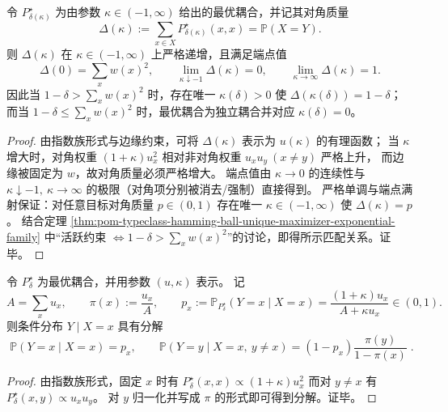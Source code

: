 \begin{theorem}[对角质量的严格单调性与唯一匹配]\label{thm:pom-typeclass-diagonal-mass-monotone}
令 \(P^\star_{\delta(\kappa)}\) 为由参数 \(\kappa\in(-1,\infty)\) 给出的最优耦合，并记其对角质量
\[
\Delta(\kappa):=\sum_{x\in X}P^\star_{\delta(\kappa)}(x,x)=\mathbb P(X=Y).
\]
则 \(\Delta(\kappa)\) 在 \(\kappa\in(-1,\infty)\) 上严格递增，且满足端点值
\[
\Delta(0)=\sum_x w(x)^2,\qquad
\lim_{\kappa\downarrow-1}\Delta(\kappa)=0,\qquad
\lim_{\kappa\to\infty}\Delta(\kappa)=1.
\]
因此当 \(1-\delta>\sum_x w(x)^2\) 时，存在唯一 \(\kappa(\delta)>0\) 使 \(\Delta(\kappa(\delta))=1-\delta\)；
而当 \(1-\delta\le \sum_x w(x)^2\) 时，最优耦合为独立耦合并对应 \(\kappa(\delta)=0\)。
\end{theorem}
\begin{proof}
由指数族形式与边缘约束，可将 \(\Delta(\kappa)\) 表示为 \(u(\kappa)\) 的有理函数；
当 \(\kappa\) 增大时，对角权重 \((1+\kappa)u_x^2\) 相对非对角权重 \(u_xu_y\ (x\neq y)\) 严格上升，
而边缘被固定为 \(w\)，故对角质量必须严格增大。
端点值由 \(\kappa\to 0\) 的连续性与 \(\kappa\downarrow-1,\ \kappa\to\infty\) 的极限（对角项分别被消去/强制）直接得到。
严格单调与端点满射保证：对任意目标对角质量 \(p\in(0,1)\) 存在唯一 \(\kappa\in(-1,\infty)\) 使 \(\Delta(\kappa)=p\)。
结合定理 \ref{thm:pom-typeclass-hamming-ball-unique-maximizer-exponential-family} 中“活跃约束 \(\Leftrightarrow 1-\delta>\sum_x w(x)^2\)”的讨论，即得所示匹配关系。证毕。
\end{proof}

\begin{theorem}\label{thm:pom-typeclass-keep-resample-channel}
令 \(P^\star_\delta\) 为最优耦合，并用参数 \((u,\kappa)\) 表示。
记
\[
A=\sum_x u_x,\qquad \pi(x):=\frac{u_x}{A},
\qquad
p_x:=\mathbb P_{P^\star_\delta}(Y=x\mid X=x)=\frac{(1+\kappa)u_x}{A+\kappa u_x}\in(0,1).
\]
则条件分布 \(Y\mid X=x\) 具有分解
\[
\boxed{\;
\mathbb P(Y=x\mid X=x)=p_x,\qquad
\mathbb P(Y=y\mid X=x,\ y\neq x)=(1-p_x)\frac{\pi(y)}{1-\pi(x)}\; }.
\]
\end{theorem}
\begin{proof}
由指数族形式，固定 \(x\) 时有
\(
P^\star_\delta(x,x)\propto (1+\kappa)u_x^2
\)
而对 \(y\neq x\) 有
\(
P^\star_\delta(x,y)\propto u_xu_y
\)。
对 \(y\) 归一化并写成 \(\pi\) 的形式即可得到分解。证毕。
\end{proof}

